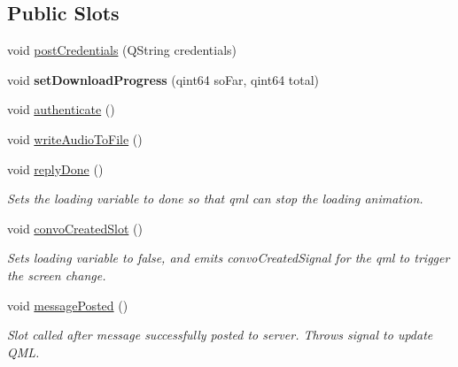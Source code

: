 \subsection*{Public Slots}
\begin{DoxyCompactItemize}
\item 
void \hyperlink{classHttpManager_ac1e6cdef1723a7b28a348b3046ddfe86}{post\-Credentials} (Q\-String credentials)
\item 
\hypertarget{classHttpManager_ac2d51aca5099ecc22abed34fc2d20083}{void {\bfseries set\-Download\-Progress} (qint64 so\-Far, qint64 total)}\label{classHttpManager_ac2d51aca5099ecc22abed34fc2d20083}

\item 
void \hyperlink{classHttpManager_a7dd56984ebb6adbad298a755c0b4d66a}{authenticate} ()
\item 
void \hyperlink{classHttpManager_a5a810bffa61e583780bfdaca7e85a9fd}{write\-Audio\-To\-File} ()
\item 
\hypertarget{classHttpManager_afcc4a484cd9acbb604b95fe273c0fd80}{void \hyperlink{classHttpManager_afcc4a484cd9acbb604b95fe273c0fd80}{reply\-Done} ()}\label{classHttpManager_afcc4a484cd9acbb604b95fe273c0fd80}

\begin{DoxyCompactList}\small\item\em Sets the loading variable to done so that qml can stop the loading animation. \end{DoxyCompactList}\item 
\hypertarget{classHttpManager_aa22b5c70375b6df662da1dfc4ba29620}{void \hyperlink{classHttpManager_aa22b5c70375b6df662da1dfc4ba29620}{convo\-Created\-Slot} ()}\label{classHttpManager_aa22b5c70375b6df662da1dfc4ba29620}

\begin{DoxyCompactList}\small\item\em Sets loading variable to false, and emits convo\-Created\-Signal for the qml to trigger the screen change. \end{DoxyCompactList}\item 
\hypertarget{classHttpManager_a0e0fcfe7fd5ecd0b63e0208e3ba28a5c}{void \hyperlink{classHttpManager_a0e0fcfe7fd5ecd0b63e0208e3ba28a5c}{message\-Posted} ()}\label{classHttpManager_a0e0fcfe7fd5ecd0b63e0208e3ba28a5c}

\begin{DoxyCompactList}\small\item\em Slot called after message successfully posted to server. Throws signal to update Q\-M\-L. \end{DoxyCompactList}\end{DoxyCompactItemize}
